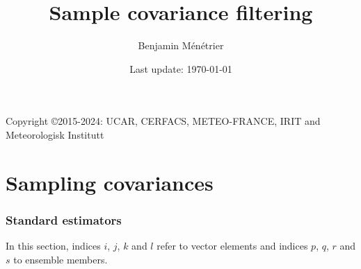 \documentclass[12pt]{scrartcl}
\begin{document}
\title{Sample covariance filtering}
\author{Benjamin Ménétrier}
\date{Last update: \today}

\thispagestyle{empty}

\maketitle
\begin{center}
Copyright \copyright 2015-2024: UCAR, CERFACS, METEO-FRANCE, IRIT and Meteorologisk Institutt
\end{center}

\tableofcontents

\clearpage

\part{Sampling covariances}

\section{Standard estimators}

In this section, indices $i$, $j$, $k$ and $l$ refer to vector elements and indices $p$, $q$, $r$ and $s$ to ensemble members.
\end{document}
